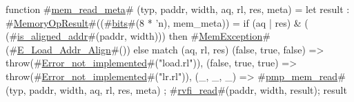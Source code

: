 function #\hyperref[sailRISCVzmemzyreadzymeta]{mem\_read\_meta}# (typ, paddr, width, aq, rl, res, meta) = {
  let result : #\hyperref[sailRISCVzMemoryOpResult]{MemoryOpResult}#((#\hyperref[sailRISCVzbits]{bits}#(8 * 'n), mem_meta)) =
    if (aq | res) & (~ (#\hyperref[sailRISCVziszyalignedzyaddr]{is\_aligned\_addr}#(paddr, width)))
    then #\hyperref[sailRISCVzMemException]{MemException}#(#\hyperref[sailRISCVzEzyLoadzyAddrzyAlign]{E\_Load\_Addr\_Align}#())
    else match (aq, rl, res) {
      (false, true,  false) => throw(#\hyperref[sailRISCVzErrorzynotzyimplemented]{Error\_not\_implemented}#("load.rl")),
      (false, true,  true)  => throw(#\hyperref[sailRISCVzErrorzynotzyimplemented]{Error\_not\_implemented}#("lr.rl")),
      (_, _, _)             => #\hyperref[sailRISCVzpmpzymemzyread]{pmp\_mem\_read}#(typ, paddr, width, aq, rl, res, meta)
    };
  #\hyperref[sailRISCVzrvfizyread]{rvfi\_read}#(paddr, width, result);
  result
}
